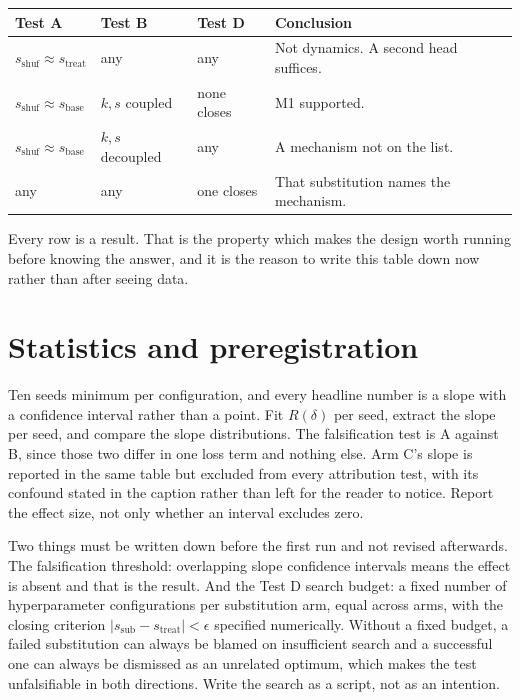 \documentclass[9pt]{extarticle}
\begin{document}
\begin{center}
\footnotesize
\begin{tabular}{@{}p{3.3cm} p{3.3cm} p{2.6cm} p{6.4cm}@{}}
\toprule
Test A & Test B & Test D & Conclusion \\
\midrule
$s_{\text{shuf}} \approx s_{\text{treat}}$ & any & any & Not dynamics. A second head suffices. \\
$s_{\text{shuf}} \approx s_{\text{base}}$ & $k, s$ coupled & none closes & M1 supported. \\
$s_{\text{shuf}} \approx s_{\text{base}}$ & $k, s$ decoupled & any & A mechanism not on the list. \\
any & any & one closes & That substitution names the mechanism. \\
\bottomrule
\end{tabular}
\end{center}

Every row is a result. That is the property which makes the design worth running before knowing the answer, and it is the reason to write this table down now rather than after seeing data.

\section{Statistics and preregistration}

Ten seeds minimum per configuration, and every headline number is a slope with a confidence interval rather than a point. Fit $R(\delta)$ per seed, extract the slope per seed, and compare the slope distributions. The falsification test is A against B, since those two differ in one loss term and nothing else. Arm C's slope is reported in the same table but excluded from every attribution test, with its confound stated in the caption rather than left for the reader to notice. Report the effect size, not only whether an interval excludes zero.

Two things must be written down before the first run and not revised afterwards. The falsification threshold: overlapping slope confidence intervals means the effect is absent and that is the result. And the Test D search budget: a fixed number of hyperparameter configurations per substitution arm, equal across arms, with the closing criterion $|s_{\text{sub}} - s_{\text{treat}}| < \epsilon$ specified numerically. Without a fixed budget, a failed substitution can always be blamed on insufficient search and a successful one can always be dismissed as an unrelated optimum, which makes the test unfalsifiable in both directions. Write the search as a script, not as an intention.
\end{document}
